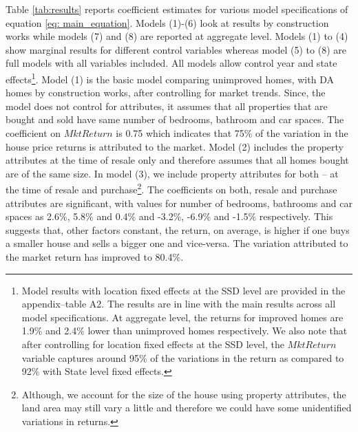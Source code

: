 \documentclass[AEJ,reqno, draftmode]{AEA} %
\begin{document}
Table \ref{tab:results} reports coefficient estimates for various model specifications of equation \eqref{eq: main_equation}. Models (1)-(6) look at results by construction works while models (7) and (8) are reported at aggregate level. Models (1) to (4) show marginal results for different control variables whereas model (5) to (8) are full models with all variables included. All models allow control year and state effects\footnote{Model results with location fixed effects at the SSD level are provided in the appendix--table A2. The results are in line with the main results across all model specifications. At aggregate level, the returns for improved homes are 1.9\% and 2.4\% lower than unimproved homes respectively. We also note that after controlling for location fixed effects at the SSD level, the $MktReturn$ variable captures around 95\% of the variations in the return as compared to 92\% with State level fixed effects.}.  Model (1) is the basic model comparing unimproved homes, with DA homes by construction works, after controlling for market trends. Since, the model does not control for attributes, it assumes that all properties that are bought and sold have same number of bedrooms, bathroom and car spaces. The coefficient on $MktReturn$ is 0.75 which indicates that 75\% of the variation in the house price returns is attributed to the market. Model (2) includes the property attributes at the time of resale only and therefore assumes that all homes bought are of the same size. In model (3), we include property attributes for both -- at the time of resale and purchase\footnote{Although, we account for the size of the house using property attributes, the land area may still vary a little and therefore we could have some unidentified variations in returns.}. The coefficients on both, resale and purchase attributes are significant, with values for number of bedrooms, bathrooms and car spaces as 2.6\%, 5.8\% and 0.4\% and -3.2\%, -6.9\% and -1.5\% respectively. This suggests that, other factors constant, the return, on average, is higher if one buys a smaller house and sells a bigger one and vice-versa. The variation attributed to the market return has improved to 80.4\%. 
\end{document}
